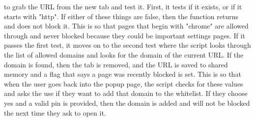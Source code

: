 \documentclass[12pt]{article}
\begin{document}
to grab the URL from the new tab and test it. First, it tests if it exists, or if it starts with "http". If either of these things are false, then the function returns and does not block it.
This is so that pages that begin with "chrome" are allowed through and never blocked because they could be important settings pages.
If it passes the first test, it moves on to the second test where the script looks through the list of allowed domains and looks for the domain of the current URL. If the domain is found, then the tab is removed, and the URL is saved to shared memory and a flag that says a page was recently blocked is set.
This is so that when the user goes back into the popup page, the script checks for these values and asks the use if they want to add that domain to the whitelist. If they choose yes and a valid pin is provided, then the domain
is added and will not be blocked the next time they ask to open it.
\\\\
\end{document}
